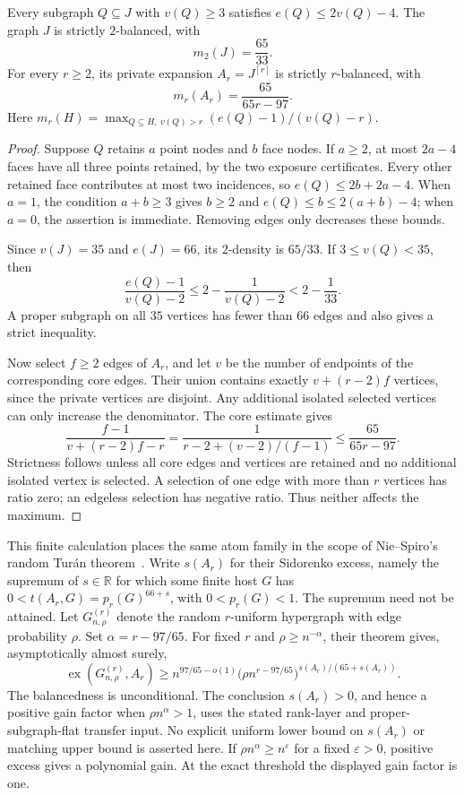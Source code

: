 \begin{proposition}
\label{density-incidence-strict-balance}
Every subgraph $Q\subseteq J$ with $v(Q)\ge3$ satisfies
$e(Q)\le2v(Q)-4$.  The graph $J$ is strictly $2$-balanced, with
\[
 m_2(J)=\frac{65}{33}.
\]
For every $r\ge2$, its private expansion $A_r=J^{[r]}$ is strictly
$r$-balanced, with
\[
 m_r(A_r)=\frac{65}{65r-97}.
\]
Here $m_r(H)=\max_{Q\subseteq H,\ v(Q)>r}(e(Q)-1)/(v(Q)-r)$.
\end{proposition}
\begin{proof}
Suppose $Q$ retains $a$ point nodes and $b$ face nodes.  If $a\ge2$,
at most $2a-4$ faces have all three points retained, by the two exposure
certificates.  Every other retained face contributes at most two
incidences, so $e(Q)\le2b+2a-4$.  When $a=1$, the condition $a+b\ge3$
gives $b\ge2$ and $e(Q)\le b\le2(a+b)-4$; when $a=0$, the assertion
is immediate.  Removing edges only decreases these bounds.

Since $v(J)=35$ and $e(J)=66$, its $2$-density is $65/33$.
If $3\le v(Q)<35$, then
\[
 \frac{e(Q)-1}{v(Q)-2}
 \le 2-\frac1{v(Q)-2}<2-\frac1{33}.
\]
A proper subgraph on all $35$ vertices has fewer than $66$ edges and
also gives a strict inequality.

Now select $f\ge2$ edges of $A_r$, and let $v$ be the number of
endpoints of the corresponding core edges.  Their union contains
exactly $v+(r-2)f$ vertices, since the private vertices are disjoint.
Any additional isolated selected vertices can only increase the
denominator.  The core estimate gives
\[
 \frac{f-1}{v+(r-2)f-r}
 =\frac1{r-2+(v-2)/(f-1)}
 \le\frac{65}{65r-97}.
\]
Strictness follows unless all core edges and vertices are retained
and no additional isolated vertex is selected.  A selection of one
edge with more than $r$ vertices has ratio zero; an edgeless selection
has negative ratio.  Thus neither affects the maximum.
\end{proof}

This finite calculation places the same atom family in the scope of
Nie--Spiro's random Tur\'an theorem~\citep{niespiro2025}.
Write $s(A_r)$ for their Sidorenko excess, namely the supremum of
$s\in\mathbb R$ for which some finite host $G$ has
$0<t(A_r,G)=p_r(G)^{66+s}$, with $0<p_r(G)<1$.
The supremum need not be attained.  Let $G^{(r)}_{n,\rho}$ denote the random
$r$-uniform hypergraph with edge probability $\rho$.
Set $\alpha=r-97/65$.  For fixed $r$ and
$\rho\ge n^{-\alpha}$, their theorem gives, asymptotically almost surely,
\[
 \operatorname{ex}(G^{(r)}_{n,\rho},A_r)
 \ge n^{97/65-o(1)}
       \bigl(\rho n^{r-97/65}\bigr)^{s(A_r)/(65+s(A_r))}.
\]
The balancedness is unconditional.  The conclusion $s(A_r)>0$,
and hence a positive gain factor when $\rho n^\alpha>1$,
uses the stated rank-layer and proper-subgraph-flat transfer input.
No explicit uniform lower bound on $s(A_r)$ or matching upper bound
is asserted here.
If $\rho n^\alpha\ge n^\varepsilon$ for a fixed $\varepsilon>0$,
positive excess gives a polynomial gain.  At the exact threshold the
displayed gain factor is one.

